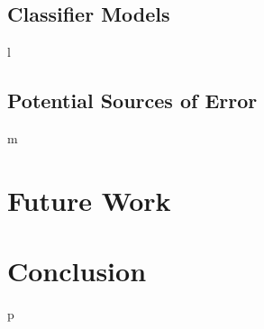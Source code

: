 \documentclass[11pt]{article}
\begin{document}
	\subsection{Classifier Models}
l	
	\subsection{Potential Sources of Error}
m
\section{Future Work}
	
\section{Conclusion}
p	

\pagebreak

\end{document}
